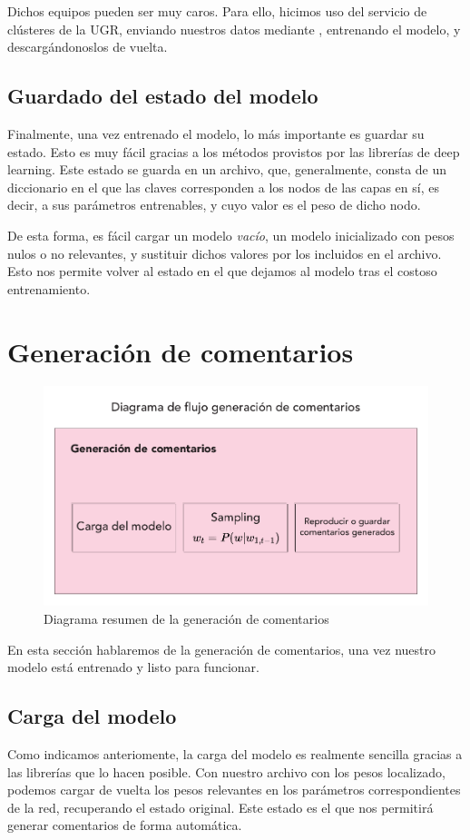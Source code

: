 Dichos equipos pueden ser muy caros. Para ello, hicimos uso del servicio de clústeres de la UGR, enviando nuestros datos mediante , entrenando el modelo, y descargándonoslos de vuelta.

\subsection{Guardado del estado del modelo}
Finalmente, una vez entrenado el modelo, lo más importante es guardar su estado. Esto es muy fácil gracias a los métodos provistos por las librerías de deep learning. Este estado se guarda en un archivo, que, generalmente, consta de un diccionario en el que las claves corresponden a los nodos de las capas en sí, es decir, a sus parámetros entrenables, y cuyo valor es el peso de dicho nodo. 

De esta forma, es fácil cargar un modelo \textit{vacío}, un modelo inicializado con pesos nulos o no relevantes, y sustituir dichos valores por los incluidos en el archivo. Esto nos permite volver al estado en el que dejamos al modelo tras el costoso entrenamiento.

\section{Generación de comentarios}

\begin{figure}[h]
	\centering
	\includegraphics[width=.9\textwidth]{media/comment-gen.pdf}
	\caption{Diagrama resumen de la generación de comentarios}
	\label{fig:comment-gen}
\end{figure}

En esta sección hablaremos de la generación de comentarios, una vez nuestro modelo está entrenado y listo para funcionar. 

\subsection{Carga del modelo}
Como indicamos anteriomente, la carga del modelo es realmente sencilla gracias a las librerías que lo hacen posible. Con nuestro archivo con los pesos localizado, podemos cargar de vuelta los pesos relevantes en los parámetros correspondientes de la red, recuperando el estado original. Este estado es el que nos permitirá generar comentarios de forma automática.

